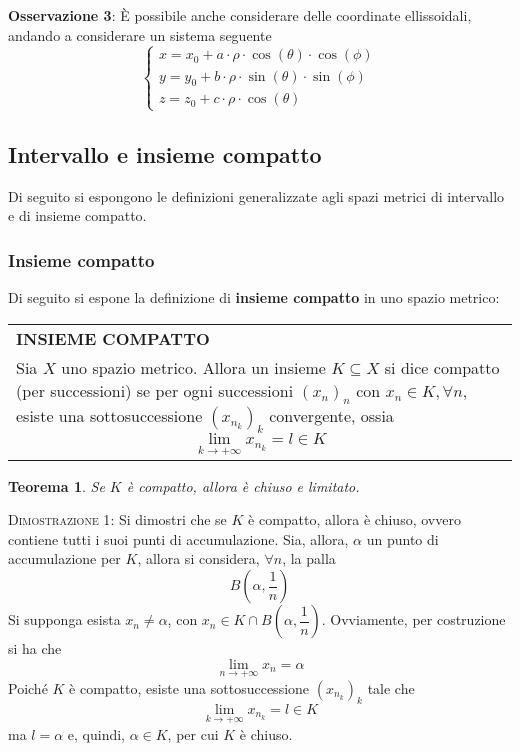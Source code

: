 \documentclass[a4paper]{extarticle}
\newtheorem{theorem}{Teorema}[section]
\renewcommand\arraystretch{}
\begin{document}
\vspace{1em}
\noindent
\textbf{Osservazione 3}: È possibile anche considerare delle coordinate ellissoidali, andando a considerare un sistema seguente
\[
\left\{
    \begin{array}{l}
        x=x_0 + a \cdot \rho \cdot \cos(\theta) \cdot \cos(\phi)\\
        y=y_0 + b \cdot \rho \cdot \sin(\theta) \cdot \sin(\phi)\\
        z=z_0 + c \cdot \rho \cdot \cos(\theta)
    \end{array}  
    \right.
\]

\vspace{1em}
\noindent
\subsection{Intervallo e insieme compatto}
Di seguito si espongono le definizioni generalizzate agli spazi metrici di intervallo e di insieme compatto.

\vspace{1em}
\noindent
\subsubsection{Insieme compatto}
Di seguito si espone la definizione di \textbf{insieme compatto} in uno spazio metrico:

\vspace{1em}
\setlength{\tabcolsep}{14pt}
\renewcommand{\arraystretch}{2}
\noindent
\begin{tabularx}{\textwidth}{@{}|P|@{}}
    \hline
    {\textbf{INSIEME COMPATTO}}\\
    \parbox{\linewidth}{Sia $X$ uno spazio metrico. Allora un insieme $K \subseteq X$ si dice compatto (per successioni) se per ogni successioni $(x_n)_n$ con $x_n \in K, \forall n$, esiste una sottosuccessione $(x_{n_k})_k$ convergente, ossia
    \[\lim_{k \to +\infty} x_{n_k} = l \in K\] \vspace{3mm}}\\
    \hline
\end{tabularx}

\vspace{1em}
\noindent
\begin{theorem}
    Se $K$ è compatto, allora è chiuso e limitato.
\end{theorem}

\vspace{2em}
\noindent
\normalfont \normalsize
\textsc{Dimostrazione 1}: Si dimostri che se $K$ è compatto, allora è chiuso, ovvero contiene tutti i suoi punti di accumulazione. Sia, allora, $\alpha$ un punto di accumulazione per $K$, allora si considera, $\forall n$, la palla
\[B \left(\alpha, \frac{1}{n}\right)\]
Si supponga esista $x_n \neq \alpha$, con $x_n \in K \cap B \left(\alpha, \dfrac{1}{n}\right)$. Ovviamente, per costruzione si ha che
\[\lim_{n \to +\infty} x_n = \alpha\]
Poiché $K$ è compatto, esiste una sottosuccessione $(x_{n_k})_k$ tale che
\[\lim_{k \to +\infty} x_{n_k} = l \in K\]
ma $l=\alpha$ e, quindi, $\alpha \in K$, per cui $K$ è chiuso.
\end{document}
